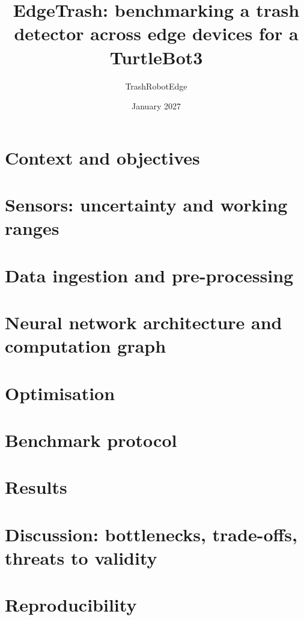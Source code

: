 \documentclass[11pt,a4paper]{article}
\title{EdgeTrash: benchmarking a trash detector across edge devices for a TurtleBot3}
\author{TrashRobotEdge}
\date{January 2027}
\begin{document}
\maketitle

\section{Context and objectives}                 %
\section{Sensors: uncertainty and working ranges} %
\section{Data ingestion and pre-processing}      %
\section{Neural network architecture and computation graph} %
\section{Optimisation}                           %
\section{Benchmark protocol}                     %
\section{Results}                                %
\section{Discussion: bottlenecks, trade-offs, threats to validity}
\section{Reproducibility}                        %
\end{document}
